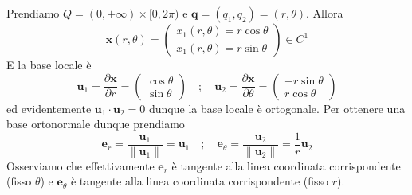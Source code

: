 \begin{example}
    Prendiamo \(Q = {(0, +\infty)} \times  [0, 2\pi)\) e \(\mathbf{q} = {(q_{1},
    q_{2})} = {(r, \theta)}\). Allora 
    \[
      \mathbf{x} {(r, \theta)} = \begin{pmatrix}
          x_{1}{(r, \theta)}=r \cos \theta \\
          x_{1}{(r, \theta)}=r \sin \theta
      \end{pmatrix} \in C^{1}
    \]
    E la base locale è 
    \[
        \mathbf{u}_1 = \frac{\partial \mathbf{x} }{\partial r} = \begin{pmatrix}
            \cos \theta \\
            \sin \theta
        \end{pmatrix} \quad ; \quad \mathbf{u}_2 = \frac{\partial \mathbf{x}}{\partial \theta} = \begin{pmatrix}
            -r \sin \theta \\
            r \cos \theta
        \end{pmatrix}
    \]
    ed evidentemente \(\mathbf{u}_1 \cdot \mathbf{u}_2 = 0\) dunque la base
    locale è ortogonale. Per ottenere una base ortonormale dunque prendiamo
    \[
      \mathbf{e}_r = \frac{\mathbf{u}_1}{\|\mathbf{u}_1\|} = \mathbf{u}_1 \quad
      ; \quad \mathbf{e}_\theta = \frac{\mathbf{u}_2}{\|\mathbf{u}_2\|} =
      \frac{1}{r} \mathbf{u}_2 
    \]
    Osserviamo che effettivamente \(\mathbf{e}_r\) è tangente alla linea
    coordinata corrispondente (fisso \(\theta\)) e \(\mathbf{e}_\theta\) è
    tangente alla linea coordinata corrispondente (fisso \(r\)).
\end{example}
